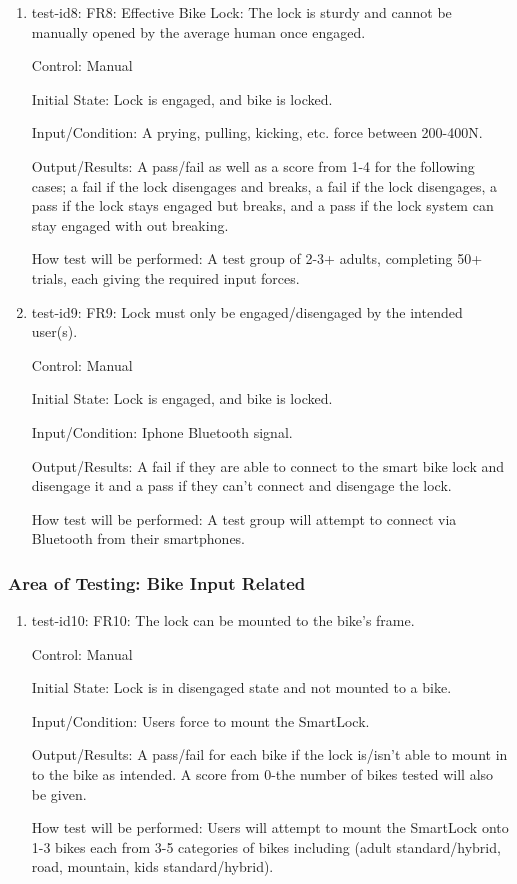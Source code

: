 \documentclass[12pt, titlepage]{article}
\begin{document}
\begin{enumerate}
\item{test-id8: FR8: Effective Bike Lock: The lock is sturdy and cannot be manually opened by the average human once engaged. \\}

Control: Manual

Initial State: Lock is engaged, and bike is locked.

Input/Condition: A prying, pulling, kicking, etc. force between 200-400N.

Output/Results: A pass/fail as well as a score from 1-4 for the following cases; a fail if the lock disengages and breaks, a fail if the lock disengages, a pass if the lock stays engaged but breaks, and a pass if the lock system can stay engaged with out breaking.

How test will be performed: A test group of 2-3+ adults, completing 50+ trials, each giving the required input forces.

\item{test-id9: FR9: Lock must only be engaged/disengaged by the intended user(s). \\}

Control: Manual

Initial State: Lock is engaged, and bike is locked.

Input/Condition: Iphone Bluetooth signal.

Output/Results: A fail if they are able to connect to the smart bike lock and disengage it and a pass if they can’t connect and disengage the lock.

How test will be performed: A test group will attempt to connect via Bluetooth from their smartphones.

\end{enumerate}

\subsubsection{Area of Testing: Bike Input Related}

\begin{enumerate}

\item{test-id10: FR10: The lock can be mounted to the bike’s frame. \\}

Control: Manual

Initial State: Lock is in disengaged state and not mounted to a bike.

Input/Condition: Users force to mount the SmartLock.

Output/Results: A pass/fail for each bike if the lock is/isn’t able to mount in to the bike as intended. A score from 0-the number of bikes tested will also be given.

How test will be performed: Users will attempt to mount the SmartLock onto 1-3 bikes each from 3-5 categories of bikes including (adult standard/hybrid, road, mountain, kids standard/hybrid).

\end{enumerate}
\end{document}
